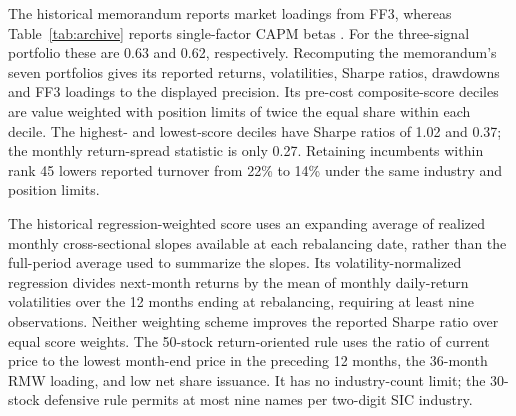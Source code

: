 \documentclass[letterpaper,journal]{IEEEtran}
\begin{document}
The historical memorandum reports market loadings from FF3, whereas Table~\ref{tab:archive} reports single-factor CAPM betas \cite{teamrecord}. For the three-signal portfolio these are 0.63 and 0.62, respectively. Recomputing the memorandum's seven portfolios gives its reported returns, volatilities, Sharpe ratios, drawdowns and FF3 loadings to the displayed precision. Its pre-cost composite-score deciles are value weighted with position limits of twice the equal share within each decile. The highest- and lowest-score deciles have Sharpe ratios of 1.02 and 0.37; the monthly return-spread statistic is only 0.27. Retaining incumbents within rank 45 lowers reported turnover from 22\% to 14\% under the same industry and position limits.

The historical regression-weighted score uses an expanding average of realized monthly cross-sectional slopes available at each rebalancing date, rather than the full-period average used to summarize the slopes. Its volatility-normalized regression divides next-month returns by the mean of monthly daily-return volatilities over the 12 months ending at rebalancing, requiring at least nine observations. Neither weighting scheme improves the reported Sharpe ratio over equal score weights. The 50-stock return-oriented rule uses the ratio of current price to the lowest month-end price in the preceding 12 months, the 36-month RMW loading, and low net share issuance. It has no industry-count limit; the 30-stock defensive rule permits at most nine names per two-digit SIC industry.
\end{document}

